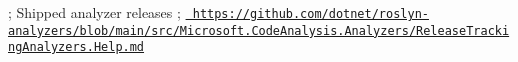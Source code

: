 ; Shipped analyzer releases ; \href{https://github.com/dotnet/roslyn-analyzers/blob/main/src/Microsoft.CodeAnalysis.Analyzers/ReleaseTrackingAnalyzers.Help.md}{\texttt{ https\+://github.\+com/dotnet/roslyn-\/analyzers/blob/main/src/\+Microsoft.\+Code\+Analysis.\+Analyzers/\+Release\+Tracking\+Analyzers.\+Help.\+md}} 